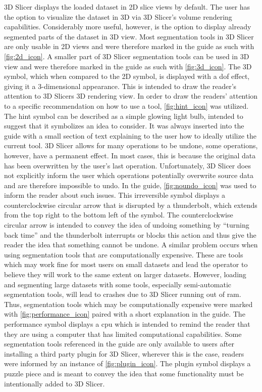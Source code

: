 \noindent
3D Slicer displays the loaded dataset in 2D slice views by default.
The user has the option to visualize the dataset in 3D via 3D Slicer's volume rendering capabilities.
Considerably more useful, however, is the option to display already segmented parts of the dataset in 3D view.
Most segmentation tools in 3D Slicer are only usable in 2D views and were therefore marked in the guide as such with \cref{fig:2d_icon}.
A smaller part of 3D Slicer segmentation tools can be used in 3D view and were therefore marked in the guide as such with \cref{fig:3d_icon}.
The 3D symbol, which when compared to the 2D symbol, is displayed with a \acrfull{dof} effect, giving it a 3-dimensional appearance.
This is intended to draw the reader's attention to 3D Slicers 3D rendering view.
In order to draw the readers' attention to a specific recommendation on how to use a tool, \cref{fig:hint_icon} was utilized.
The hint symbol can be described as a simple glowing light bulb, intended to suggest that it symbolizes an idea to consider.
It was always inserted into the guide with a small section of text explaining to the user how to ideally utilize the current tool.
3D Slicer allows for many operations to be undone, some operations, however, have a permanent effect.
In most cases, this is because the original data has been overwritten by the user's last operation.
Unfortunately, 3D Slicer does not explicitly inform the user which operations potentially overwrite source data and are therefore impossible to undo.
In the guide, \cref{fig:noundo_icon} was used to inform the reader about such issues.
This irreversible symbol displays a counterclockwise circular arrow that is disrupted by a thunderbolt, which extends from the top right to the bottom left of the symbol.
The counterclockwise circular arrow is intended to convey the idea of undoing something by ``turning back time'' and the thunderbolt interrupts or blocks this action and thus give the reader the idea that something cannot be undone.
A similar problem occurs when using segmentation tools that are computationally expensive.
These are tools which may work fine for most users on small datasets and lead the operator to believe they will work to the same extent on larger datasets.
However, loading and segmenting large datasets with some tools, especially semi-automatic segmentation tools, will lead to crashes due to 3D Slicer running out of \acrfull{ram}.
Thus, segmentation tools which may be computationally expensive were marked with \cref{fig:performance_icon} paired with a short explanation in the guide.
The performance symbol displays a \acrfull{cpu} which is intended to remind the reader that they are using a computer that has limited computational capabilities.
Some segmentation tools referenced in the guide are only available to users after installing a third party plugin for 3D Slicer, wherever this is the case, readers were informed by an instance of \cref{fig:plugin_icon}.
The plugin symbol displays a puzzle piece and is meant to convey the idea that some functionality must be intentionally added to 3D Slicer.

